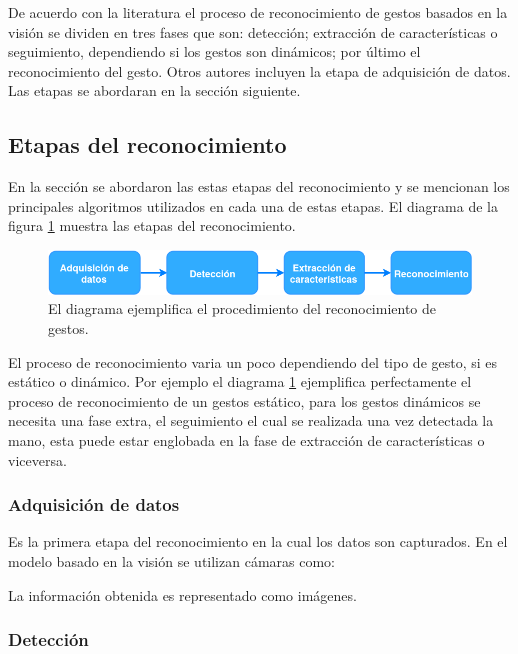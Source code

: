 De acuerdo con la literatura el proceso de reconocimiento de gestos basados en la visión se dividen en tres \citep{Rautaray2012} fases que son: detección; extracción de características o seguimiento, dependiendo si los gestos son dinámicos; por último el reconocimiento del gesto. Otros autores \citep{Hasan2012} incluyen la etapa de adquisición de datos. Las etapas se abordaran en la sección siguiente. 


\subsection{Etapas del reconocimiento}\label{subsec:EtapasReconocimiento}  
En la sección se abordaron las estas etapas del reconocimiento y se mencionan los principales algoritmos utilizados en cada una de estas etapas. El diagrama de la figura \ref{fig:HGR} muestra las etapas del reconocimiento.  

\begin{figure}[h!]
\begin{center}
\includegraphics[scale=.6]{./Figures/HGR.png}
\end{center}
\caption{El diagrama ejemplifica el procedimiento del reconocimiento de gestos.}
\label{fig:HGR}
\end{figure}

El proceso de reconocimiento varia un poco dependiendo del tipo de gesto, si es estático o dinámico. Por ejemplo el diagrama \ref{fig:HGR} ejemplifica perfectamente el proceso de reconocimiento de un gestos estático, para los gestos dinámicos se necesita una fase extra, el seguimiento el cual se realizada una vez detectada la mano, esta puede estar englobada en la fase de extracción de características o viceversa. 

\subsubsection{Adquisición de datos}\label{sssec:EtapaAdquisicion}

Es la primera etapa del reconocimiento en la cual los datos son capturados. En el modelo basado en la visión se utilizan cámaras como: 

La información obtenida es representado como imágenes. 

\subsubsection{Detección}\label{sssec:EtapaDeteccion}

